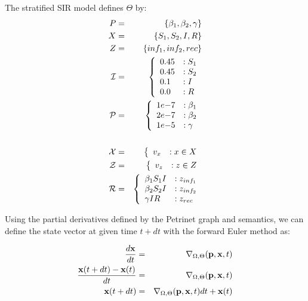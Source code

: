 \begin{example}
    The stratified SIR model defines $\Theta$ by:
    \begin{eqnarray*}
        P &=& \{\beta_1, \beta_2, \gamma\}\\
        X &=& \{S_1, S_2, I, R\}\\
        Z &=& \{inf_1, inf_2, rec\}\\
        {\cal I} &=& \left\{ 
            \begin{array}{ll}
                0.45& :S_1\\
                0.45& :S_2\\
                0.1& :I\\
                0.0& :R
            \end{array}\right.\\
        {\cal P}&=& \left\{ 
            \begin{array}{ll}
                1e{-7}& :\beta_1\\
                2e{-7}& :\beta_2\\
                1e{-5}& :\gamma
            \end{array}\right.\\
            \\
        {\cal X} &=& \left\{ 
            \begin{array}{ll}
                v_{x} & : x \in X
            \end{array}\right.\\
        {\cal Z} &=& \left\{ 
            \begin{array}{ll}
                v_{z} & : z \in Z
            \end{array}\right.\\
        {\cal R} &=& \left\{ 
            \begin{array}{ll}
                \beta_1 S_1 I & : z_{inf_1}\\
                \beta_2 S_2 I & : z_{inf_2}\\
                \gamma I R & : z_{rec}\\
            \end{array}\right.\\
    \end{eqnarray*}
\end{example}


Using the partial derivatives defined by the Petrinet graph and semantics, we
can define the state vector at given time $t+dt$ with the forward Euler method
as:

\begin{eqnarray*}
    \frac{d {\bf x}}{dt} &=& \nabla_{\Omega, \Theta}({\bf p},{\bf x}, t)\\
    \frac{{\bf x}(t+dt)-{\bf x}(t)}{dt} &=& \nabla_{\Omega, \Theta}({\bf p},{\bf x},
    t)\\
    {\bf x}(t+dt)&=& \nabla_{\Omega, \Theta}({\bf p},{\bf x}, t)dt+ {\bf x}(t)
\end{eqnarray*}

